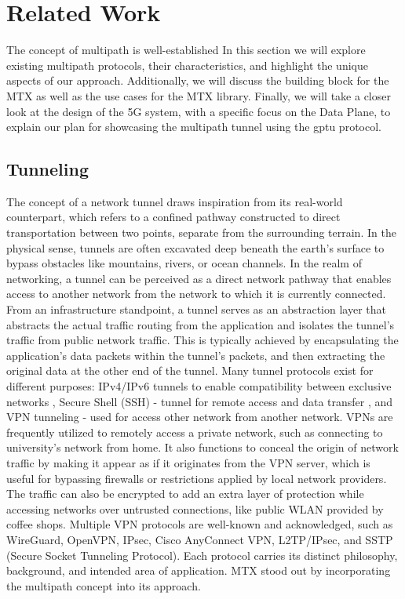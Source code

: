 \chapter{Related Work}\label{sec:related_work}\minitoc\vspace{.5cm}

The concept of multipath is well-established
In this section we will explore existing multipath protocols, their characteristics, and highlight the unique aspects of our approach. 
Additionally, we will discuss the building block for the MTX as well as the use cases for the \ac{MTX} library. 
Finally, we will take a closer look at the design of the 5G system, with a specific focus on the Data Plane, to explain our plan for showcasing the multipath tunnel using the \ac{gptu} protocol.

\section{Tunneling}
The concept of a network tunnel draws inspiration from its real-world counterpart, which refers to a confined pathway constructed to direct transportation between two points, separate from the surrounding terrain. 
In the physical sense, tunnels are often excavated deep beneath the earth's surface to bypass obstacles like mountains, rivers, or ocean channels.
In the realm of networking, a tunnel can be perceived as a direct network pathway that enables access to another network from the network to which it is currently connected. 
From an infrastructure standpoint, a tunnel serves as an abstraction layer that abstracts the actual traffic routing from the application and isolates the tunnel's traffic from public network traffic. 
This is typically achieved by encapsulating the application's data packets within the tunnel's packets, and then extracting the original data at the other end of the tunnel.
Many tunnel protocols exist for different purposes: IPv4/IPv6 tunnels to enable compatibility between exclusive networks \cite{rfc4380_Teredo_ipv6_tunnel_udp}, Secure Shell (SSH) - tunnel for remote access and data transfer \cite{rfc4251_ssh_protocol}, and \ac{VPN} tunneling - used for access other network from another network. 
\ac{VPN}s are frequently utilized to remotely access a private network, such as connecting to university's network from home. 
It also functions to conceal the origin of network traffic by making it appear as if it originates from the VPN server, which is useful for bypassing firewalls or restrictions applied by local network providers.
The traffic can also be encrypted to add an extra layer of protection while accessing networks over untrusted connections, like public WLAN provided by coffee shops.
Multiple VPN protocols are well-known and acknowledged, such as WireGuard, OpenVPN, IPsec, Cisco AnyConnect VPN, L2TP/IPsec, and SSTP (Secure Socket Tunneling Protocol). 
Each protocol carries its distinct philosophy, background, and intended area of application. 
MTX stood out by incorporating the multipath concept into its approach.

